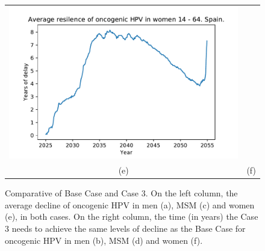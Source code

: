 \begin{figure}[!]
\begin{tabular}{cc}
		\includegraphics[width=0.5\linewidth]{IMGs/11.-Resilencia/Base_y_3/resilencia_onco_muj.pdf}  \\ 
		(e)	& (f) \\  
	\end{tabular} 
	\caption{Comparative of Base Case and Case 3. On the left column, the average decline of oncogenic HPV in men (a), MSM (c) and women (e), in both cases. On the right column, the time (in years) the Case 3 needs to achieve the same levels of decline as the Base Case for oncogenic HPV in men (b), MSM (d) and women (f).}
	\label{fig:baseCase_Case3}
\end{figure}

